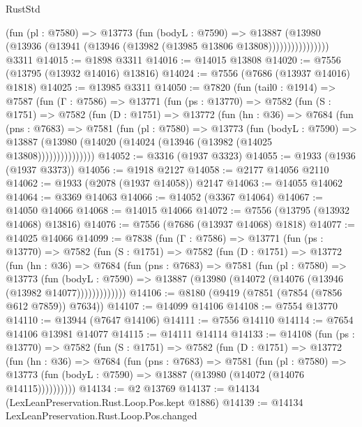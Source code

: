 \begin{lexlean}{RustStd}
\begin{coremodule}
                    (fun (pl : @7580) =>
                    @13773
                      (fun (bodyL : @7590) =>
                      @13887
                        (@13980
                          (@13936 (@13941 (@13946 (@13982 (@13985 @13806 @13808))))))))))))))))
    @3311
@14015 := @1898 @3311
@14016 := @14015 @13808
@14020 := @7556 (@13795 (@13932 @14016) @13816)
@14024 := @7556 (@7686 (@13937 @14016) @1818)
@14025 := @13985 @3311
@14050 := @7820
    (fun (tail0 : @1914) =>
    @7587
      (fun (Γ : @7586) =>
      @13771
        (fun (ps : @13770) =>
        @7582
          (fun (S : @1751) =>
          @7582
            (fun (D : @1751) =>
            @13772
              (fun (hn : @36) =>
              @7684
                (fun (pns : @7683) =>
                @7581
                  (fun (pl : @7580) =>
                  @13773
                    (fun (bodyL : @7590) =>
                    @13887 (@13980 (@14020 (@14024 (@13946 (@13982 (@14025 @13808)))))))))))))))
@14052 := @3316 (@1937 @3323)
@14055 := @1933 (@1936 (@1937 @3373))
@14056 := @1918 @2127
@14058 := @2177 @14056 @2110
@14062 := @1933 (@2078 (@1937 @14058)) @2147
@14063 := @14055 @14062
@14064 := @3369 @14063
@14066 := @14052 (@3367 @14064)
@14067 := @14050 @14066
@14068 := @14015 @14066
@14072 := @7556 (@13795 (@13932 @14068) @13816)
@14076 := @7556 (@7686 (@13937 @14068) @1818)
@14077 := @14025 @14066
@14099 := @7838
    (fun (Γ : @7586) =>
    @13771
      (fun (ps : @13770) =>
      @7582
        (fun (S : @1751) =>
        @7582
          (fun (D : @1751) =>
          @13772
            (fun (hn : @36) =>
            @7684
              (fun (pns : @7683) =>
              @7581
                (fun (pl : @7580) =>
                @13773
                  (fun (bodyL : @7590) =>
                  @13887 (@13980 (@14072 (@14076 (@13946 (@13982 @14077)))))))))))))
@14106 := @8180 (@9419 (@7851 (@7854 (@7856 @612 @7859)) @7634))
@14107 := @14099 @14106
@14108 := @7554 @13770
@14110 := @13944 (@7647 @14106)
@14111 := @7556 @14110
@14114 := @7654 @14106 @13981 @14077
@14115 := @14111 @14114
@14133 := @14108
    (fun (ps : @13770) =>
    @7582
      (fun (S : @1751) =>
      @7582
        (fun (D : @1751) =>
        @13772
          (fun (hn : @36) =>
          @7684
            (fun (pns : @7683) =>
            @7581
              (fun (pl : @7580) =>
              @13773 (fun (bodyL : @7590) => @13887 (@13980 (@14072 (@14076 @14115))))))))))
@14134 := @2 @13769
@14137 := @14134 (LexLeanPreservation.Rust.Loop.Pos.kept @1886)
@14139 := @14134 LexLeanPreservation.Rust.Loop.Pos.changed

\end{coremodule}
\end{lexlean}

